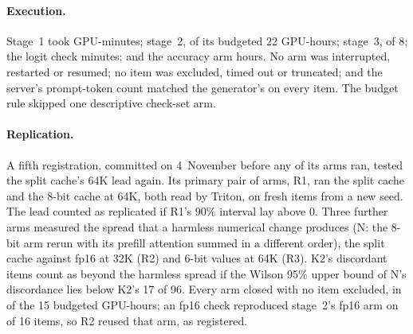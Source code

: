 \documentclass[11pt,letterpaper]{article}
\begin{document}
\paragraph{Execution.}
Stage~1 took \PeStageOneMin{} GPU-minutes; stage~2, \PeStageTwoHours{} of its
budgeted 22 GPU-hours; stage~3, \PeStageThreeHours{} of 8; the logit check
\PeKlMinutes{} minutes; and the accuracy arm \PeArmHours{} hours. No arm was
interrupted, restarted or resumed; no item was excluded, timed out or
truncated; and the server's prompt-token count matched the generator's on
every item. The budget rule skipped one descriptive check-set arm.

\paragraph{Replication.}
\label{sec:replication}
A fifth registration, committed on 4~November before any of its arms ran,
tested the split cache's 64K lead again. Its primary pair of arms, R1, ran the
split cache and the 8-bit cache at 64K, both read by Triton, on \PeROneN{}
fresh items from a new seed. The lead counted as replicated if R1's 90\%
interval lay above 0. Three further arms measured the spread that a harmless
numerical change produces (N: the 8-bit arm rerun with its prefill attention
summed in a different order), the split cache against fp16 at 32K (R2) and
6-bit values at 64K (R3). K2's discordant items count as beyond the harmless
spread if the Wilson 95\% upper bound of N's discordance lies below K2's 17 of
96. Every arm closed with no item excluded, in \PeRepHours{} of the 15
budgeted GPU-hours; an fp16 check reproduced stage~2's fp16 arm on
\PeRTwoCheck{} of 16 items, so R2 reused that arm, as registered.
\end{document}
